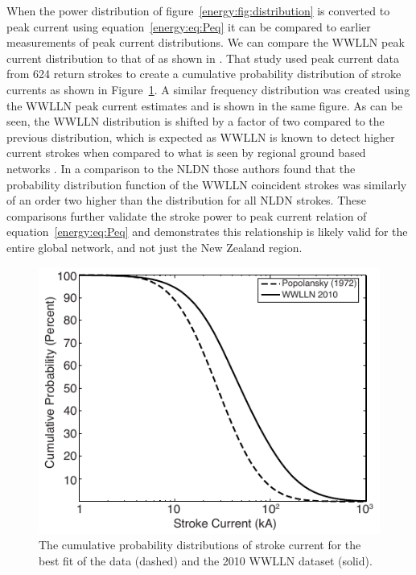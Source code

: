 When the power distribution of figure~\ref{energy:fig:distribution} is converted to peak current using equation~\ref{energy:eq:Peq} it can be compared to earlier measurements of peak current distributions.
We can compare the WWLLN peak current distribution to that of \citet{Popolansky1972} as shown in \citet{Golde1977}.
That study used peak current data from 624 return strokes to create a cumulative probability distribution of stroke currents as shown in Figure~\ref{energy:fig:PPS_CDF}.
A similar frequency distribution was created using the WWLLN peak current estimates and is shown in the same figure.
As can be seen, the WWLLN distribution is shifted by a factor of two compared to the previous distribution, which is expected as WWLLN is known to detect higher current strokes when compared to what is seen by regional ground based networks \citep{Abarca2010}.
In a comparison to the NLDN those authors found that the probability distribution function of the WWLLN coincident strokes was similarly of an order two higher than the distribution for all NLDN strokes.
These comparisons further validate the stroke power to peak current relation of equation~\ref{energy:eq:Peq} and demonstrates this relationship is likely valid for the entire global network, and not just the New Zealand region.

\begin{figure}[ht!]
\centering
\includegraphics[scale=1]{energy/Figures/PPS_CDF.pdf}
\caption{The cumulative probability distributions of stroke current for the best fit of the \citet{Popolansky1972} data (dashed) and the 2010 WWLLN dataset (solid).}
\label{energy:fig:PPS_CDF}
\end{figure}

